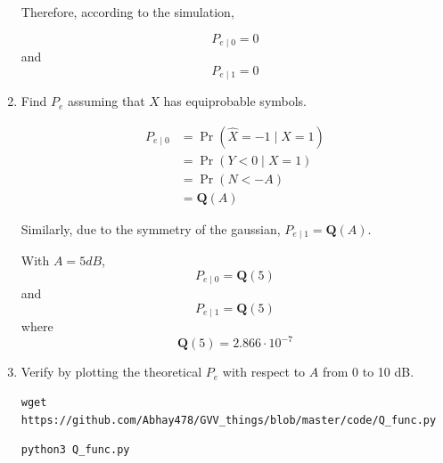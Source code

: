 \documentclass[journal,12pt,twocolumn]{IEEEtran}
\DeclareMathOperator*{\pipe}{|}
\renewcommand\thesection{\arabic{section}}
\providecommand{\pr}[1]{\ensuremath{\Pr\left(#1\right)}}
\providecommand{\brak}[1]{\ensuremath{\left(#1\right)}}
\theoremstyle{remark}
\numberwithin{equation}{section}
\numberwithin{equation}{section}
\begin{document}
\begin{enumerate}[label=\thesection.\arabic*, ref=\thesection.\theenumi]
Therefore, according to the simulation, 

\begin{equation}
	P_{e\pipe0} = 0
\end{equation}
and 
\begin{equation}
	P_{e\pipe1} = 0
\end{equation}

\item Find $P_e$ assuming that $X$ has equiprobable symbols.

\begin{align}
    P_{e\pipe0} &= \pr{\hat{X} = -1 \pipe X=1}  \label{P-e-def} \\
    &= \pr{Y < 0 \pipe X = 1} \nonumber \\
    &= \pr{N < -A} \nonumber \\
    &= \mathbf{Q}\brak{A}
\end{align}

Similarly, due to the symmetry of the gaussian, $P_{e\pipe1} = \mathbf{Q}\brak{A}$.

With $A = 5 dB$,
\begin{equation}
	P_{e\pipe0} = \mathbf{Q}\brak{5}
\end{equation}
and 
\begin{equation}
	P_{e\pipe1} = \mathbf{Q}\brak{5}
\end{equation}
where
\begin{equation}
    \mathbf{Q}\brak{5} = 2.866 \cdot 10^{-7}
\end{equation}

\item
Verify by plotting  the theoretical $P_e$ with respect to $A$ from 0 to 10 dB.  

\begin{lstlisting}
wget https://github.com/Abhay478/GVV_things/blob/master/code/Q_func.py
\end{lstlisting}

\begin{lstlisting}
python3 Q_func.py
\end{lstlisting}


\end{enumerate}
\end{document}
